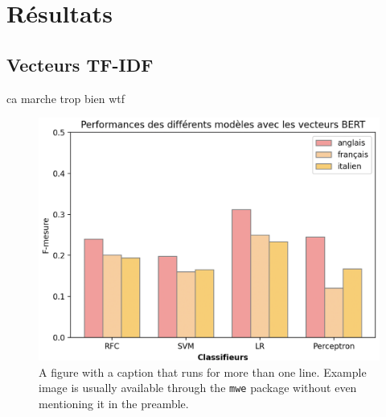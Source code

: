 \section{Résultats}
\subsection{Vecteurs TF-IDF}

ca marche trop bien wtf

\begin{figure}[t]
  \includegraphics[width=\columnwidth]{assets/cool_barplot.png}
  \caption{A figure with a caption that runs for more than one line.
    Example image is usually available through the \texttt{mwe} package
    without even mentioning it in the preamble.}
  \label{fig:experiments}
\end{figure}
